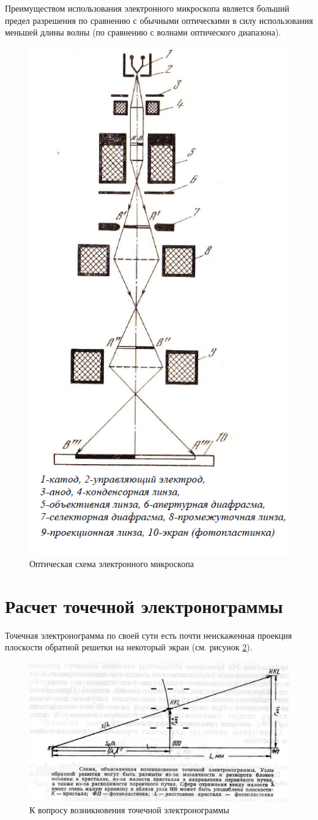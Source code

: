 \documentclass[a4paper, 12pt]{article}
\begin{document}
Преимуществом использования электронного микроскопа является больший предел разрешения по сравнению с обычными оптическими в силу использования меньшей длины волны (по сравнению с волнами оптического диапазона).

\begin{figure}[H]
	\centering
	\includegraphics[width=0.45\linewidth]{microscope}
	\caption{Оптическая схема электронного микроскопа}
	\label{fig:mic}
\end{figure}

\section{Расчет точечной электронограммы}

Точечная электронограмма по своей сути есть почти неискаженная проекция плоскости обратной решетки на некоторый экран (см. рисунок \ref{fig:dots_get}).

\begin{figure}[H]
	\centering
	\includegraphics[width=0.7\linewidth]{dots}
	\caption {К вопросу возникновения точечной электронограммы}
	\label{fig:dots_get}
\end{figure}
\end{document}
